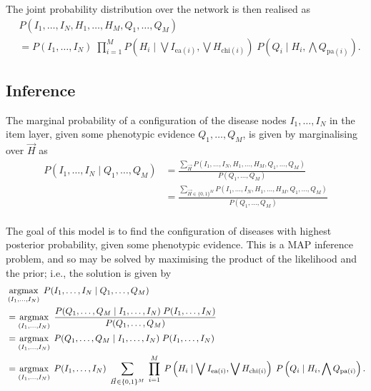 The joint probability distribution over the network is then realised as
%
\begin{align}
    &P(I_1, \hdots, I_N, H_1, \hdots, H_M, Q_1, \hdots, Q_M) \nonumber\\
    &=  P(I_1, \hdots, I_N) 
    \; \prod_{i=1}^M P\left(H_i \mid \bigvee I_{\text{ea}(i)}, \bigvee H_{\text{chi}(i)}\right)
    \; P\left(Q_i \mid H_i, \bigwedge Q_{\text{pa}(i)}\right). \label{eq:joint}
\end{align}

\subsection{Inference}

The marginal probability of a configuration of the disease nodes $I_1, \hdots,
I_N$ in the item layer, given some phenotypic evidence $Q_1, \hdots, Q_M$, is
given by marginalising over $\vec{H}$ as
%
\begin{align*}
    P(I_1, \hdots, I_N \mid Q_1, \hdots, Q_M)
    &= \frac{\sum_{\vec{H}} P(I_1, \hdots, I_N, H_1, \hdots, H_M, Q_1, \hdots, Q_M)}{P(Q_1, \hdots, Q_M)} \\
    &= \frac{\sum_{\vec{H} \in \{0, 1\}^M} P(I_1, \hdots, I_N, H_1, \hdots, H_M, Q_1, \hdots, Q_M)}{P(Q_1, \hdots, Q_M)} \\
\end{align*}

The goal of this model is to find the configuration of diseases with highest
posterior probability, given some phenotypic evidence.
%
This is a MAP inference problem, and so may be solved by maximising the product
of the likelihood and the prior; i.e., the solution is given by
%
\begin{align}
    &\argmax_{(I_1, \hdots, I_N)} \;
    P(I_1, \hdots, I_N \mid Q_1, \hdots, Q_M) \nonumber\\
    &= \argmax_{(I_1, \hdots, I_N)} \;
    \frac{P(Q_1, \hdots, Q_M \mid I_1, \hdots, I_N )\; P(I_1, \hdots, I_N)}{P(Q_1, \hdots, Q_M)} \nonumber\\
    &= \argmax_{(I_1, \hdots, I_N)} \;
    P(Q_1, \hdots, Q_M \mid I_1, \hdots, I_N )\; P(I_1, \hdots, I_N) \nonumber\\
    &= \argmax_{(I_1, \hdots, I_N)} \;
    P(I_1, \hdots, I_N)
    \;\sum_{\vec{H} \in \{0, 1\}^M} \; \prod_{i=1}^M \; P\left(H_i \mid \bigvee I_{\text{ea}(i)}, \bigvee H_{\text{chi}(i)}\right)
    \; P\left(Q_i \mid H_i, \bigwedge Q_{\text{pa}(i)}\right).\label{eq:mapinf}
\end{align}

